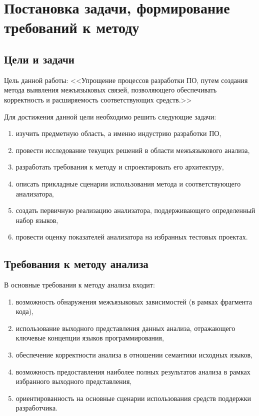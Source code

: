 \chapter{Постановка задачи, формирование требований к методу}

\section{Цели и задачи}

Цель данной работы: <<Упрощение процессов разработки ПО, путем создания метода выявления межъязыковых связей,
позволяющего обеспечивать корректность и расширяемость соответствующих средств.>>

Для достижения данной цели необходимо решить следующие задачи:
\begin{enumerate}[1)]
    \item изучить предметную область, а именно индустрию разработки ПО,
    \item провести исследование текущих решений в области межъязыкового анализа,
    \item разработать требования к методу и спроектировать его архитектуру,
    \item описать прикладные сценарии использования метода и соответствующего анализатора,
    \item создать первичную реализацию анализатора, поддерживающего определенный набор языков,
    \item провести оценку показателей анализатора на избранных тестовых проектах.
\end{enumerate}


\section{Требования к методу анализа}

В основные требования к методу анализа входит:
\begin{enumerate}[1)]
    \item возможность обнаружения межъязыковых зависимостей (в рамках фрагмента кода),
    \item использование выходного представления данных анализа, отражающего ключевые концепции
    языков программирования,
    \item обеспечение корректности анализа в отношении семантики исходных языков,
    \item возможность предоставления наиболее полных результатов анализа в рамках
    избранного выходного представления,
    \item ориентированность на основные сценарии использования средств
    поддержки разработчика.
\end{enumerate}

